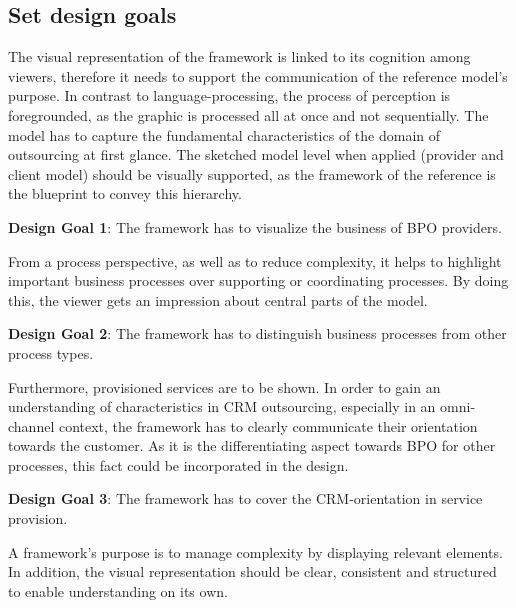 	\subsection{Set design goals}
	
	The visual representation of the framework is linked to its cognition among viewers, therefore it needs to support the communication of the reference model's purpose. In contrast to language-processing, the process of perception is foregrounded, as the graphic is processed all at once and not sequentially. The model has to capture the fundamental characteristics of the domain of outsourcing at first glance. The sketched model level when applied (provider and client model) should be visually supported, as the framework of the reference is the blueprint to convey this hierarchy. 
	
	\hfill\begin{minipage}{\dimexpr\textwidth-1.2cm}
		\textbf{Design Goal 1}: The framework has to visualize the business of BPO providers.
	\end{minipage}

From a process perspective, as well as to reduce complexity, it helps to highlight important business processes over supporting or coordinating processes. By doing this, the viewer gets an impression about central parts of the model. 

	\hfill\begin{minipage}{\dimexpr\textwidth-1.2cm}
	\textbf{Design Goal 2}: The framework has to distinguish business processes from other process types. 
\end{minipage}

Furthermore, provisioned services are to be shown. In order to gain an understanding of characteristics in CRM outsourcing, especially in an omni-channel context, the framework has to clearly communicate their orientation towards the customer. As it is the differentiating aspect towards BPO for other processes, this fact could be incorporated in the design.  

	\hfill\begin{minipage}{\dimexpr\textwidth-1.2cm}
	\textbf{Design Goal 3}: The framework has to cover the CRM-orientation in service provision. 
\end{minipage}

A framework's purpose is to manage complexity by displaying relevant elements. In addition, the visual representation should be clear, consistent and structured to enable understanding on its own. 

